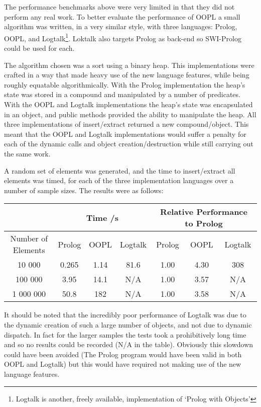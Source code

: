 \documentclass[12pt,a4paper,twoside,openright]{report}
\begin{document}
The performance benchmarks above were very limited in that they did not perform any real work. To better evaluate the performance of OOPL a small algorithm was written, in a very similar style, with three languages: Prolog, OOPL, and Logtalk\footnote{Logtalk is another, freely available, implementation of `Prolog with Objects'}. Loktalk also targets Prolog as back-end so SWI-Prolog could be used for each.

\bigskip

The algorithm chosen was a sort using a binary heap. This implementations were crafted in a way that made heavy use of the new language features, while being roughly equatable algorithmically. With the Prolog implementation the heap's state was stored in a compound and manipulated by a number of predicates. With the OOPL and Logtalk implementations the heap's state was encapsulated in an object, and public methods provided the ability to manipulate the heap. All three implementations of insert/extract returned a new compound/object. This meant that the OOPL and Logtalk implementations would suffer a penalty for each of the dynamic calls and object creation/destruction while still carrying out the same work.

\bigskip

A random set of elements was generated, and the time to insert/extract all elements was timed, for each of the three implementation languages over a number of sample sizes. The results were as follows:

\begin{center}
\begin{tabular}{c|c|c|c|c|c|c}
 & \multicolumn{3}{c}{Time /s} &  \multicolumn{3}{c}{Relative Performance to Prolog}\\
 \hline
Number of Elements 	& Prolog & OOPL & Logtalk & Prolog & OOPL & Logtalk \\
\hline
 10 000				& 0.265	& 1.14	& 81.6 & 1.00	& 4.30	& 308		\\
 100 000			& 3.95	& 14.1	& N/A  & 1.00	& 3.57	& N/A		\\
 1 000 000			& 50.8	&182 	& N/A  & 1.00	& 3.58	& N/A		\\
\end{tabular}
\end{center}

It should be noted that the incredibly poor performance of Logtalk was due to the dynamic creation of such a large number of objects, and not due to dynamic dispatch. In fact for the larger samples the tests took a prohibitively long time and so no results could be recorded (N/A in the table). Obviously this slowdown could have been avoided (The Prolog program would have been valid in both OOPL and Logtalk) but this would have required not making use of the new language features.
\end{document}
